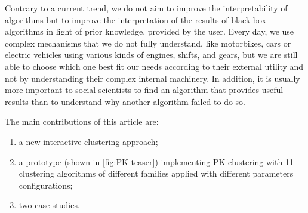 Contrary to a current trend\cite{molnar2019}, we do not aim to improve the interpretability of algorithms but to improve the interpretation of the results of black-box algorithms in light of prior knowledge, provided by the user. Every day, we use complex mechanisms that we do not fully understand, like motorbikes, cars or electric vehicles using various kinds of engines, shifts, and gears, but we are still able to choose which one best fit our needs according to their external utility and not by understanding their complex internal machinery. In addition, it is usually more important to social scientists to find an algorithm that provides useful results than to understand why another algorithm failed to do so.

The main contributions of this article are:
\begin{enumerate}[left=0pt .. \parindent,nosep]
\item a new interactive clustering approach;
\item a prototype (shown in \autoref{fig:PK-teaser}) implementing PK-clustering with 11 clustering algorithms of different families applied with different parameters configurations;
\item two case studies.
\end{enumerate}

%
%


